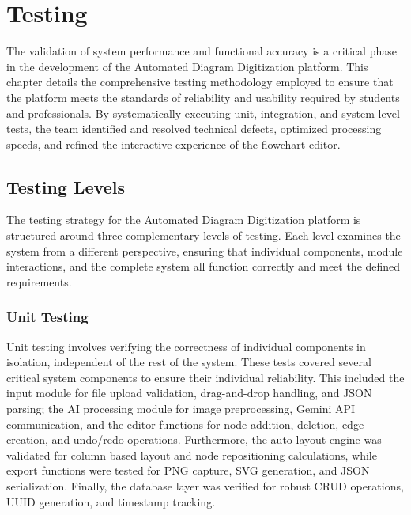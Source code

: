 \chapter{Testing}
\label{ch:testing}

The validation of system performance and functional accuracy is 
a critical phase in the development of the Automated Diagram 
Digitization platform. This chapter details the comprehensive 
testing methodology employed to ensure that the platform meets 
the standards of reliability and usability required by students 
and professionals. By systematically executing unit, 
integration, and system-level tests, the team identified and 
resolved technical defects, optimized processing speeds, and 
refined the interactive experience of the flowchart 
editor.

\section{Testing Levels}
\label{sec:testing-levels}

The testing strategy for the Automated Diagram Digitization 
platform is structured around three complementary levels of 
testing. Each level examines the system from a different 
perspective, ensuring that individual components, module 
interactions, and the complete system all function correctly 
and meet the defined requirements.

\subsection{Unit Testing}
\label{subsec:unit-testing}

Unit testing involves verifying the correctness of individual 
components in isolation, independent of the rest of the system. These tests covered several critical system components to ensure their individual reliability. This included the input module for file upload validation, drag-and-drop handling, and JSON parsing; the AI processing module for image preprocessing, Gemini API communication, and the editor functions for node addition, deletion, edge creation, and undo/redo operations. Furthermore, the auto-layout engine was validated for column based layout and node repositioning calculations, while export functions were tested for PNG capture, SVG generation, and JSON serialization. Finally, the database layer was verified for robust CRUD operations, UUID generation, and timestamp tracking.

